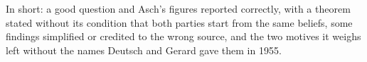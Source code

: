 \begin{afterword}
In short: a good question and Asch's figures reported correctly, with a theorem stated without its condition that both parties start from the same beliefs, some findings simplified or credited to the wrong source, and the two motives it weighs left without the names Deutsch and Gerard gave them in 1955.
\end{afterword}
